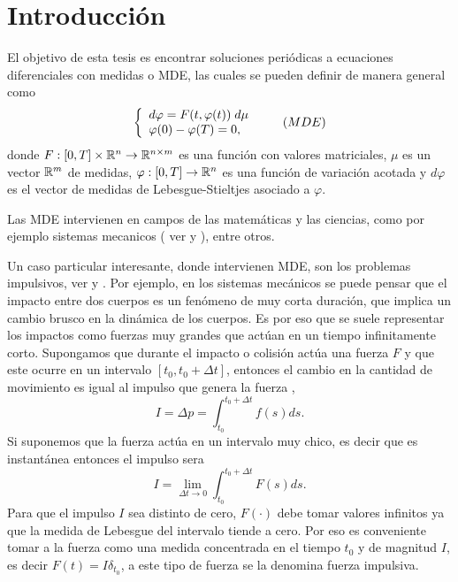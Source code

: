 

\chapter{Introducción}
El objetivo de esta tesis es encontrar soluciones periódicas a ecuaciones diferenciales con medidas o MDE, las cuales se pueden definir de manera general como 
	\begin{equation*}
	\left\lbrace \begin{array}{l} \label{eq:problema A}
		d\varphi=F(t,\varphi(t))\;d \mu\\
		\varphi(0)-\varphi(T)=0,
	\end{array}\right. \tag{${MDE}$}
\end{equation*}
donde $F:[0,T]\times\mathbb{R}^n\to\mathbb{R}^{n\times m}$ es una función con valores matriciales, $\mu$ es un vector  $\mathbb{R}^m$ de medidas, $\varphi:[0,T]\to \mathbb{R}^n$ es una función de variación acotada  y $d\varphi$ es el vector de medidas de Lebesgue-Stieltjes asociado a $\varphi$.

Las MDE intervienen en campos de las matemáticas y las ciencias, como por ejemplo sistemas mecanicos ( ver \cite{Brogliato} y \cite{ALeonov}), entre otros.


Un caso particular interesante, donde intervienen MDE, son los problemas impulsivos, ver \cite{Bainov} y \cite{Lakshmikan}. Por ejemplo, en los sistemas mecánicos se puede pensar que el impacto entre dos cuerpos es un fenómeno de muy corta duración, que implica un cambio brusco en la dinámica de los cuerpos. Es por eso que se suele representar los impactos como fuerzas muy grandes que actúan en un tiempo infinitamente corto. Supongamos que durante el impacto o colisión actúa una fuerza $F$ y que este ocurre en un intervalo $[t_0,t_0+\Delta t]$, entonces el cambio en la cantidad de movimiento es igual al impulso que genera la fuerza  \cite{Serway}, 
$$I=\Delta p=\int_{t_0}^{t_0+\Delta t}f(s)ds.$$
Si suponemos que la fuerza actúa en un intervalo muy chico, es decir que es instantánea entonces el impulso sera
    \begin{equation*}
        I=\lim_{\Delta t \to 0}\int_{t_0}^{t_0+\Delta t}F(s) ds. 
    \end{equation*}
Para que el impulso $I$ sea distinto de cero, $F(\cdot)$ debe tomar valores infinitos ya que la medida de Lebesgue del intervalo tiende a cero. Por eso es conveniente tomar a la fuerza como una medida concentrada en el tiempo $t_0$ y de magnitud $I$, es decir $F(t)=I\delta_{t_0}$, a este tipo de fuerza se la  denomina fuerza impulsiva.

